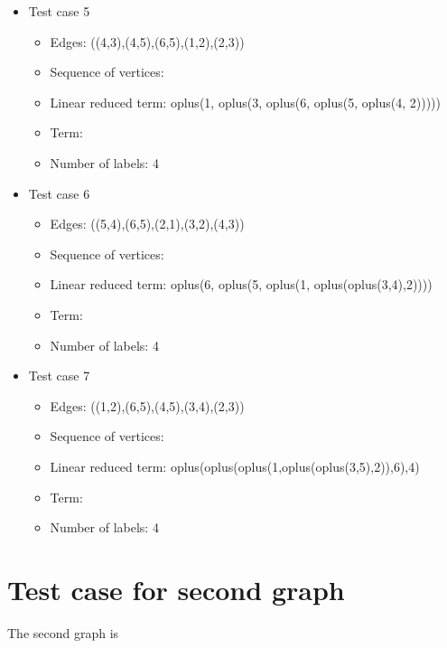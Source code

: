 \documentclass[a4paper, 12pt]{article}
\begin{document}
\begin{itemize}
\item Test case 5
	\begin{itemize}
		\item Edges: ((4,3),(4,5),(6,5),(1,2),(2,3))
		\item Sequence of vertices: 
		\item Linear reduced term: oplus(1, oplus(3, oplus(6, oplus(5, oplus(4, 2)))))
		\item Term: 
		\item Number of labels: 4
	\end{itemize}

\item Test case 6
	\begin{itemize}
		\item Edges: ((5,4),(6,5),(2,1),(3,2),(4,3))
		\item Sequence of vertices: 
		\item Linear reduced term: oplus(6, oplus(5, oplus(1, oplus(oplus(3,4),2))))
		\item Term: 
		\item Number of labels: 4
	\end{itemize}

\item Test case 7
	\begin{itemize}
		\item Edges: ((1,2),(6,5),(4,5),(3,4),(2,3))
		\item Sequence of vertices: 
		\item Linear reduced term: oplus(oplus(oplus(1,oplus(oplus(3,5),2)),6),4)
		\item Term: 
		\item Number of labels: 4
	\end{itemize}
\end{itemize}

\section{Test case for second graph}
The second graph is
\end{document}
